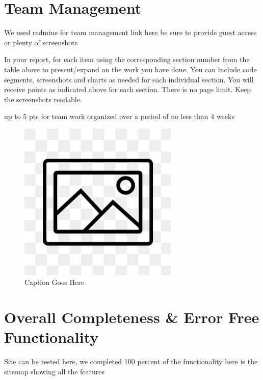 \documentclass[12pt, letterpaper]{article}
\begin{document}
 \newpage

\section{Team Management}
We used redmine for team management link here be sure to provide guest access or plenty of screenshots

In your report, for each item using the corresponding section number from the table above to present/expand on the work you have done. You can include code segments, screenshots and charts as needed for each individual section. You will receive points as indicated above for each section. There is no page limit. Keep the screenshots readable.

up to 5 pts for team work organized over a period of no less than 4 weeks

\begin{figure}[htbp]
	\centering
	\includegraphics[width=3in]{images/placeholder.jpg}
	\caption{Caption Goes Here}
 \end{figure}

 \newpage

\section{Overall Completeness \& Error Free Functionality}
Site can be tested here, we completed 100 percent of the functionality here is the sitemap showing all the features
\end{document}
